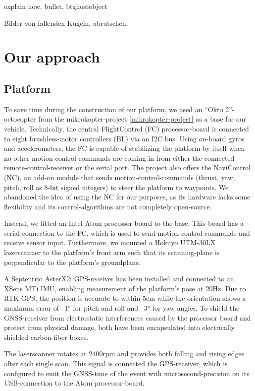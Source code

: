 \documentclass[a4paper, 10pt, conference]{ieeeconf}        %
\begin{document}
explain how. bullet, btghostobject

Bilder von fallenden Kugeln, abrutschen.

\section{Our approach}

\subsection{Platform}

To save time during the construction of our platform, we used an "`Okto 2"'-octocopter from the mikrokopter-project \ref{mikrokopter-project} as a base for our vehicle. Technically, the central FlightControl (FC) processor-board is connected to eight brushless-motor controllers (BL) via an I2C bus. Using on-board gyros and accelerometers, the FC is capable of stabilizing the platform by itself when no other motion-control-commands are coming in from either the connected remote-control-receiver or the serial port. The project also offers the NaviControl (NC), an add-on module that sends motion-control-commands (thrust, yaw, pitch, roll as 8-bit signed integers) to steer the platform to waypoints. We abandoned the idea of using the NC for our purposes, as its hardware lacks some flexibility and its control-algorithms are not completely open-source.

Instead, we fitted an Intel Atom processor-board to the base. This board has a serial connection to the FC, which is used to send motion-control-commands and receive sensor input. Furthermore, we mounted a Hokuyo UTM-30LX laserscanner to the platform's front arm such that its scanning-plane is perpendicular to the platform's groundplane.

A Septentrio AsterX2i GPS-receiver has been installed and connected to an XSens MTi IMU, enabling measurement of the platform's pose at 20Hz. Due to RTK-GPS, the position is accurate to within 5cm while the orientation shows a maximum error of ~1° for pitch and roll and ~3° for yaw angles. To shield the GNSS-receiver from electrostatic interferences caused by the processor board and protect from physical damage, both have been encapsulated into electrically shielded carbon-fiber boxes.

The laserscanner rotates at 2400rpm and provides both falling and rising edges after each single scan. This signal is connected the GPS-receiver, which is configured to emit the GNSS-time of the event with microsecond-precision on its USB-connection to the Atom processor-board.
\end{document}
